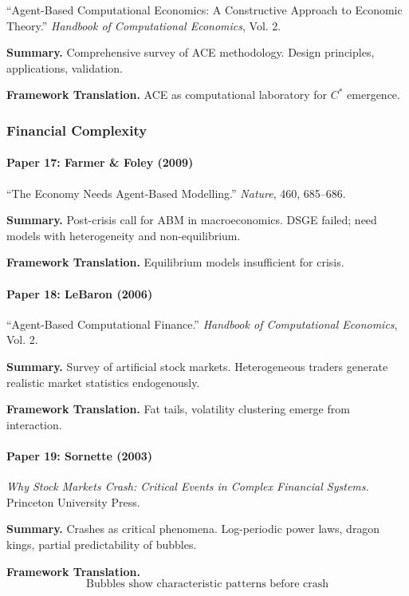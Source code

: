 ``Agent-Based Computational Economics: A Constructive Approach to Economic Theory.''
\textit{Handbook of Computational Economics}, Vol. 2.

\textbf{Summary.}
Comprehensive survey of ACE methodology. Design principles, 
applications, validation.

\textbf{Framework Translation.}
ACE as computational laboratory for $C^*$ emergence.

\subsubsection{Financial Complexity}

\paragraph{Paper 17: Farmer \& Foley (2009)}

``The Economy Needs Agent-Based Modelling.''
\textit{Nature}, 460, 685--686.

\textbf{Summary.}
Post-crisis call for ABM in macroeconomics. DSGE failed; 
need models with heterogeneity and non-equilibrium.

\textbf{Framework Translation.}
Equilibrium models insufficient for crisis.

\paragraph{Paper 18: LeBaron (2006)}

``Agent-Based Computational Finance.''
\textit{Handbook of Computational Economics}, Vol. 2.

\textbf{Summary.}
Survey of artificial stock markets. Heterogeneous traders generate 
realistic market statistics endogenously.

\textbf{Framework Translation.}
Fat tails, volatility clustering emerge from interaction.

\paragraph{Paper 19: Sornette (2003)}

\textit{Why Stock Markets Crash: Critical Events in Complex Financial Systems.}
Princeton University Press.

\textbf{Summary.}
Crashes as critical phenomena. Log-periodic power laws, dragon kings, 
partial predictability of bubbles.

\textbf{Framework Translation.}
\begin{equation}
\text{Bubbles show characteristic patterns before crash}
\end{equation}

